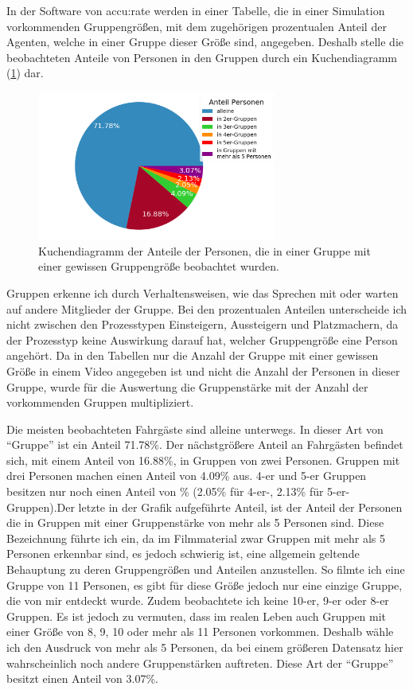 In der Software von accu:rate werden in einer Tabelle, die in einer Simulation vorkommenden Gruppengrößen, mit dem zugehörigen prozentualen Anteil der Agenten, welche in einer Gruppe dieser Größe sind, angegeben. Deshalb stelle die beobachteten Anteile von Personen in den Gruppen durch ein Kuchendiagramm (\figurename \ref{fig:AnteileGruppen}) dar.
\begin{figure}[H]
	\centering
		\includegraphics[width=0.7\textwidth]{pictures/data_evaluation/groups/groups.png}
	\caption{Kuchendiagramm der Anteile der Personen, die in einer Gruppe mit einer gewissen Gruppengröße beobachtet wurden.}
	\label{fig:AnteileGruppen}
\end{figure}
Gruppen erkenne ich durch Verhaltensweisen, wie das Sprechen mit oder warten auf andere Mitglieder der Gruppe. Bei den prozentualen Anteilen unterscheide ich nicht zwischen den Prozesstypen Einsteigern, Aussteigern und Platzmachern, da der Prozesstyp keine Auswirkung darauf hat, welcher Gruppengröße eine Person angehört. Da in den Tabellen nur die Anzahl der Gruppe mit einer gewissen Größe in einem Video angegeben ist und nicht die Anzahl der Personen in dieser Gruppe, wurde für die Auswertung die Gruppenstärke mit der Anzahl der vorkommenden Gruppen multipliziert. 

Die meisten beobachteten Fahrgäste sind alleine unterwegs. In dieser Art von "`Gruppe"' ist ein Anteil 71.78\%. Der nächstgrößere Anteil an Fahrgästen befindet sich, mit einem Anteil von 16.88\%, in Gruppen von zwei Personen. Gruppen mit drei Personen machen einen Anteil von 4.09\% aus. 4-er und 5-er Gruppen besitzen nur noch einen Anteil von \% (2.05\% für 4-er-, 2.13\% für 5-er-Gruppen).Der letzte in der Grafik aufgeführte Anteil, ist der Anteil der Personen die in Gruppen mit einer Gruppenstärke von mehr als 5 Personen sind. Diese Bezeichnung führte ich ein, da im Filmmaterial zwar Gruppen mit mehr als 5 Personen erkennbar sind, es jedoch schwierig ist, eine allgemein geltende Behauptung zu deren Gruppengrößen und Anteilen anzustellen. So filmte ich \zB eine Gruppe von 11 Personen, es gibt für diese Größe jedoch nur eine einzige Gruppe, die von mir entdeckt wurde. Zudem beobachtete ich keine 10-er, 9-er oder 8-er Gruppen. Es ist jedoch zu vermuten, dass im realen Leben auch Gruppen mit einer Größe von 8, 9, 10 oder mehr als 11 Personen vorkommen. Deshalb wähle ich den Ausdruck von mehr als 5 Personen, da bei einem größeren Datensatz hier wahrscheinlich noch andere Gruppenstärken auftreten. Diese Art der "`Gruppe"' besitzt einen Anteil von 3.07\%.

